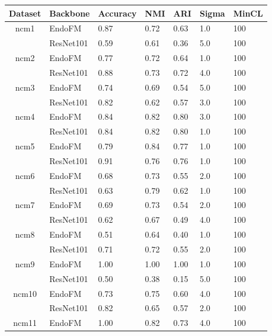 \begin{table}[h]
\small
\setlength\tabcolsep{3pt}
    \centering
    \vspace{-0.05in}
    \begin{tabular}{cllllll}
    \toprule
        Dataset & Backbone & Accuracy & NMI & ARI & Sigma & MinCL \\
        \midrule
    \multirow{2}{*}{ncm1}
 & EndoFM & 0.87 & 0.72 & 0.63 & 1.0 & 100 \\
     & ResNet101 & 0.59 & 0.61 & 0.36 & 5.0 & 100 \\
    \midrule
    \multirow{2}{*}{ncm2}
 & EndoFM & 0.77 & 0.72 & 0.64 & 1.0 & 100 \\
     & ResNet101 & 0.88 & 0.73 & 0.72 & 4.0 & 100 \\
    \midrule
    \multirow{2}{*}{ncm3}
 & EndoFM & 0.74 & 0.69 & 0.54 & 5.0 & 100 \\
     & ResNet101 & 0.82 & 0.62 & 0.57 & 3.0 & 100 \\
    \midrule
    \multirow{2}{*}{ncm4}
 & EndoFM & 0.84 & 0.82 & 0.80 & 3.0 & 100 \\
     & ResNet101 & 0.84 & 0.82 & 0.80 & 1.0 & 100 \\
    \midrule
    \multirow{2}{*}{ncm5}
 & EndoFM & 0.79 & 0.84 & 0.77 & 1.0 & 100 \\
     & ResNet101 & 0.91 & 0.76 & 0.76 & 1.0 & 100 \\
    \midrule
    \multirow{2}{*}{ncm6}
 & EndoFM & 0.68 & 0.73 & 0.55 & 2.0 & 100 \\
     & ResNet101 & 0.63 & 0.79 & 0.62 & 1.0 & 100 \\
    \midrule
    \multirow{2}{*}{ncm7}
 & EndoFM & 0.69 & 0.73 & 0.54 & 2.0 & 100 \\
     & ResNet101 & 0.62 & 0.67 & 0.49 & 4.0 & 100 \\
    \midrule
    \multirow{2}{*}{ncm8}
 & EndoFM & 0.51 & 0.64 & 0.40 & 1.0 & 100 \\
     & ResNet101 & 0.71 & 0.72 & 0.55 & 2.0 & 100 \\
    \midrule
    \multirow{2}{*}{ncm9}
 & EndoFM & 1.00 & 1.00 & 1.00 & 1.0 & 100 \\
     & ResNet101 & 0.50 & 0.38 & 0.15 & 5.0 & 100 \\
    \midrule
    \multirow{2}{*}{ncm10}
 & EndoFM & 0.73 & 0.75 & 0.60 & 4.0 & 100 \\
     & ResNet101 & 0.82 & 0.65 & 0.57 & 2.0 & 100 \\
    \midrule
    \multirow{2}{*}{ncm11}
 & EndoFM & 1.00 & 0.82 & 0.73 & 4.0 & 100 \\

\end{tabular}
\end{table}
